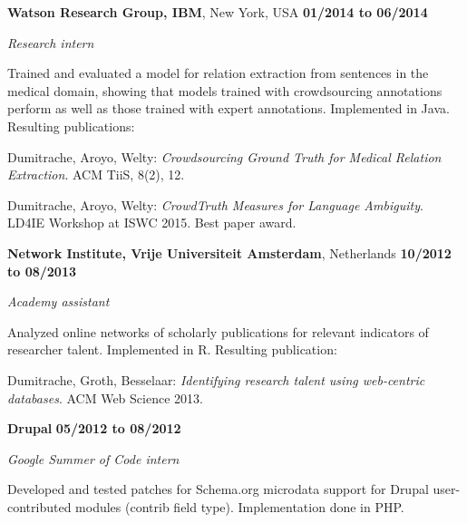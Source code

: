 \documentclass[10pt]{article}
\newcommand{\halfblankline}{\quad\vspace{-0.5\baselineskip}\pagebreak[3]}
\begin{document}
\halfblankline


{\textbf{Watson Research Group, IBM}}, New York,
USA \hfill \textbf{01/2014 to 06/2014}
\begin{outerlist}
\item[] {\it Research intern}

Trained and evaluated a model for relation extraction from sentences in the medical domain, showing that models trained with crowdsourcing annotations perform as well as those trained with expert annotations. Implemented in Java. Resulting publications:
\begin{innerlist}
\item Dumitrache, Aroyo, Welty: {\it Crowdsourcing Ground Truth for Medical Relation Extraction}. ACM TiiS, 8(2), 12.
\item Dumitrache, Aroyo, Welty: {\it CrowdTruth Measures for Language Ambiguity}. LD4IE Workshop at ISWC 2015. Best paper award.
\end{innerlist}
\end{outerlist}

\halfblankline

\textbf{Network Institute, Vrije Universiteit Amsterdam},
Netherlands \hfill \textbf{10/2012 to 08/2013}
\begin{outerlist}
\item[] {\it Academy assistant}

Analyzed online networks of scholarly publications for relevant indicators of researcher talent. Implemented in R. Resulting publication:
\begin{innerlist}
\item Dumitrache, Groth, Besselaar: {\it Identifying research talent using web-centric databases}. ACM Web Science 2013.
\end{innerlist}
\end{outerlist}

\halfblankline

\textbf{Drupal} \hfill \textbf{05/2012 to 08/2012}
\begin{outerlist}
\item[] {\it Google Summer of Code intern}

Developed and tested patches for Schema.org microdata support for Drupal user-contributed modules (contrib field type). Implementation done in PHP.
\end{outerlist}
\end{document}
